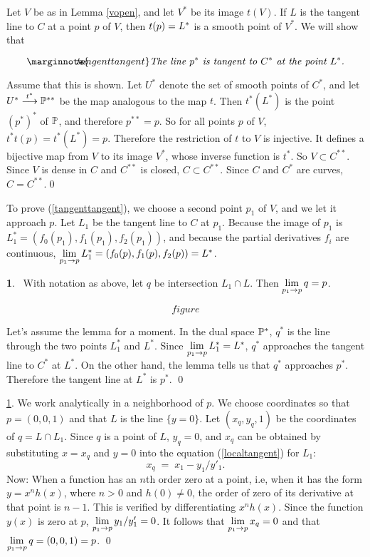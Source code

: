 \documentclass[leqno]{book}
\newcommand\Marginnote[1]{\marginnote{\hspace{-12pt}\normalfont{#1}}}
\theoremstyle{definition}%
\numberwithin{equation}{section}
\theoremstyle{theorem} %
\newtheorem{lemma}[equation]{}
\begin{document}
 Let $V$ be as in Lemma
\ref{vopen}, and let $V^*$ be its image $t(V)$.  If $L$ is the tangent
line to $C$ at a point $p$ of $V$, then $t(p) = L^*$ is a smooth point of
$V^*$.  We will show that

\begin{equation}
\label{tangenttangent}\Marginnote{tangenttangent}
\text{\it The line $p^*$ is tangent to $C^*$ at the point $L^*$.}
\end{equation}

\msno Assume that this is shown.  Let $U^*$ denote the set of smooth
points of $C^*$, and let $U^* \stackrel {t^*}{\longrightarrow} \mathbb{P}^{**}$ be the
map analogous to the map $t$. Then $t^*(L^*)$ is the point $(p^*)^*$
of $\mathbb{P}$, and therefore $p^{**} = p$.  So for all points $p$ of $V$,
$t^*t(p) = t^*(L^*) = p$.  Therefore the restriction of $t$ to $V$ is
injective.  It defines a bijective map from $V$ to its image $V^*$,
whose inverse function is $t^*$.  So $V \subset C^{**}$.  Since $V$ is
dense in $C$ and $C^{**}$ is closed, $C\subset C^{**}$.  Since $C$ and
$C^*$ are curves, $C=C^{**}$.\qed

\msno To prove (\ref{tangenttangent}), we choose a second point $p_1$
of $V$, and we let it approach $p$.  Let $L_1$ be the tangent line
to $C$ at $p_1$.  Because the image of $p_1$ is $L_1^* =
(f_0(p_1),f_1(p_1),f_2(p_1))$, and because the partial derivatives
$f_i$ are continuous, $\lim\limits_{p_1\rightarrow p} L_1^* = (f_0(p),f_1(p),f_2(p)) = L^*$.

\begin{lemma}{}\Marginnote{qapproachesp}\;\,
With notation as above, let $q$ be intersection $L_1\cap L$.  Then
$\lim\limits_{p_1\rightarrow p} q = p$.
\label{qapproachesp}\end{lemma}


$$figure$$

\no
Let's assume the lemma for a moment.  In the dual space $\mathbb{P}^*$,
$q^*$ is the line through the two points $L^*_1$ and $L^*$.  Since
$\lim\limits_{p_1\rightarrow p} L_1^* = L^*$, $q^*$ approaches the tangent line to $C^*$
at $L^*$.  On the other hand, the lemma tells us that $q^*$
approaches $p^*$.  Therefore the tangent line at $L^*$ is
$p^*$. \qed


 \ref{qapproachesp}. We work analytically in
a neighborhood of $p$.  We choose coordinates so that $p =
(0,0,1)$ and that $L$ is the line $\{y=0\}$.  Let $(x_q,y_q,1)$ be
the coordinates of $q = L\cap L_1$.  Since $q$ is a point of
$L$, $y_q=0$, and $x_q$ can be obtained by substituting $x=x_q$ and
$y=0$ into the equation (\ref{localtangent}) for $L_1$:
$$x_q \;= \; x_1 - y_1/y'_1.$$ Now: When a function has an $n$th order
zero at a point, i.e, when it has the form $y = x^nh(x)$, where $n>0$
and $h(0) \neq 0$, the order of zero of its derivative at that point
is $n\!-\!1$.  This is verified by differentiating $x^nh(x)$.  Since the
function $y(x)$ is zero at $p$, $\lim\limits_{p_1\rightarrow p} y_1/y'_1 = 0$.
It follows that $\lim\limits_{p_1\rightarrow p} x_q  = 0$ and that  $\lim\limits_{p_1\rightarrow p} q = (0,0,1) = p$. \qed
\end{document}
